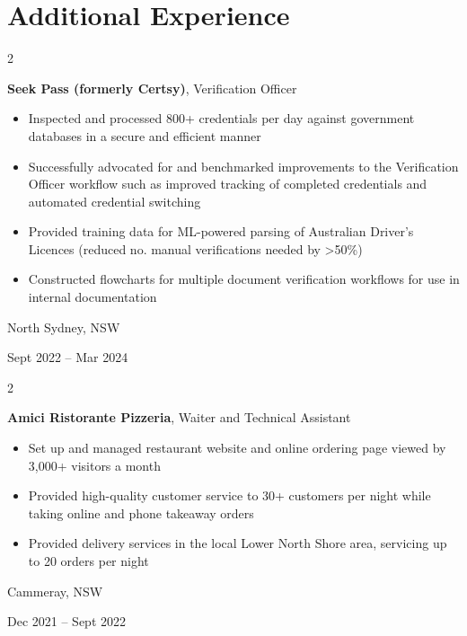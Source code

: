\documentclass[10pt, a4paper]{article}
\newenvironment{highlights}{
    \begin{itemize}[
        topsep=0.10 cm,
        parsep=0.10 cm,
        partopsep=0pt,
        itemsep=0pt,
        leftmargin=0.4 cm + 10pt
    ]
}{
    \end{itemize}
} %
\newenvironment{twocolentry}[2][]{
    \onecolentry
    \def\secondColumn{#2}
    \setcolumnwidth{\fill, 4.5 cm}
    \begin{paracol}{2}
}{
    \switchcolumn \raggedleft \secondColumn
    \end{paracol}
    \endonecolentry
} %
\begin{document}
    
    \section{Additional Experience}



        
        \begin{twocolentry}{
            North Sydney, NSW

        Sept 2022 – Mar 2024
        }
            \textbf{Seek Pass (formerly Certsy)}, Verification Officer
            \begin{highlights}
                \item Inspected and processed 800+ credentials per day against government databases in a secure and efficient manner
                \item Successfully advocated for and benchmarked improvements to the Verification Officer workflow such as improved tracking of completed credentials and automated credential switching
                \item Provided training data for ML-powered parsing of Australian Driver's Licences (reduced no. manual verifications needed by >50\%)
                \item Constructed flowcharts for multiple document verification workflows for use in internal documentation
            \end{highlights}
        \end{twocolentry}


        \vspace{0.2 cm}

        \begin{twocolentry}{
            Cammeray, NSW

        Dec 2021 – Sept 2022
        }
            \textbf{Amici Ristorante Pizzeria}, Waiter and Technical Assistant
            \begin{highlights}
                \item Set up and managed restaurant website and online ordering page viewed by 3,000+ visitors a month
                \item Provided high-quality customer service to 30+ customers per night while taking online and phone takeaway orders
                \item Provided delivery services in the local Lower North Shore area, servicing up to 20 orders per night
            \end{highlights}
        \end{twocolentry}
\end{document}

